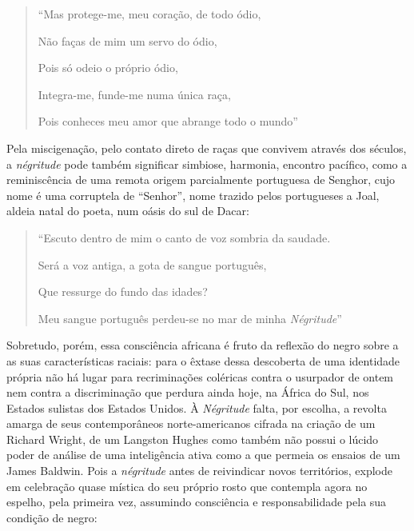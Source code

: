 \documentclass[
  letterpaper,
  DIV=11,
  numbers=noendperiod]{scrreprt}
\begin{document}
\begin{quote}
``Mas protege-me, meu coração, de todo ódio,

Não faças de mim um servo do ódio,

Pois só odeio o próprio ódio,

Integra-me, funde-me numa única raça,

Pois conheces meu amor que abrange todo o mundo''
\end{quote}

Pela miscigenação, pelo contato direto de raças que convivem através dos
séculos, a \emph{négritude} pode também significar simbiose, harmonia,
encontro pacífico, como a reminiscência de uma remota origem
parcialmente portuguesa de Senghor, cujo nome é uma corruptela de
``Senhor'', nome trazido pelos portugueses a Joal, aldeia natal do
poeta, num oásis do sul de Dacar:

\begin{quote}
``Escuto dentro de mim o canto de voz sombria da saudade.

Será a voz antiga, a gota de sangue português,

Que ressurge do fundo das idades?

Meu sangue português perdeu-se no mar de minha \emph{Négritude}''
\end{quote}

Sobretudo, porém, essa consciência africana é fruto da reflexão do negro
sobre a as suas características raciais: para o êxtase dessa descoberta
de uma identidade própria não há lugar para recriminações coléricas
contra o usurpador de ontem nem contra a discriminação que perdura ainda
hoje, na África do Sul, nos Estados sulistas dos Estados Unidos. À
\emph{Négritude} falta, por escolha, a revolta amarga de seus
contemporâneos norte-americanos cifrada na criação de um Richard Wright,
de um Langston Hughes como também não possui o lúcido poder de análise
de uma inteligência ativa como a que permeia os ensaios de um James
Baldwin. Pois a \emph{négritude} antes de reivindicar novos territórios,
explode em celebração quase mística do seu próprio rosto que contempla
agora no espelho, pela primeira vez, assumindo consciência e
responsabilidade pela sua condição de negro:
\end{document}
